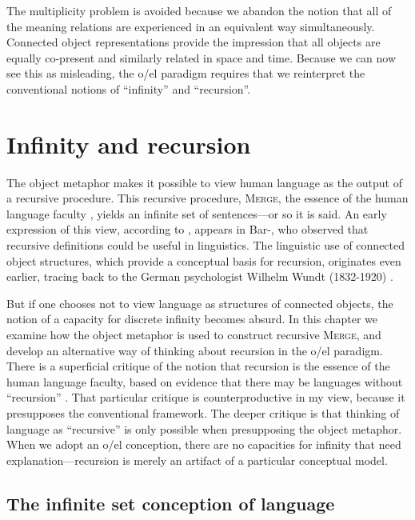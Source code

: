   The multiplicity problem is avoided because we abandon the notion that all of the meaning relations are experienced in an equivalent way simultaneously. Connected object representations provide the impression that all objects are equally co-present and similarly related in space and time. Because we can now see this as misleading, the o/el paradigm requires that we reinterpret the conventional notions of “infinity” and “recursion”.

\chapter{Infinity and recursion}

The object metaphor makes it possible to view human language as the output of a recursive procedure. This recursive procedure, \textsc{Merge}, the essence of the human language faculty \citep{Chomsky2001b,Chomsky2008}, yields an infinite set of sentences—or so it is said. An early expression of this view, according to \citet{Tomalin2007}, appears in Bar-\citet{Hillel1953}, who observed that recursive definitions could be useful in linguistics. The linguistic use of connected object structures, which provide a conceptual basis for recursion, originates even earlier, tracing back to the German psychologist Wilhelm Wundt (1832-1920) \citep{Seuren1998}.

  But if one chooses not to view language as structures of connected objects, the notion of a capacity for discrete infinity becomes absurd. In this chapter we examine how the object metaphor is used to construct recursive \textsc{Merge}, and develop an alternative way of thinking about recursion in the o/el paradigm. There is a superficial critique of the notion that recursion is the essence of the human language faculty, based on evidence that there may be languages without “recursion” \citep{Everett2005}. That particular critique is counterproductive in my view, because it presupposes the conventional framework. The deeper critique is that thinking of language as “recursive” is only possible when presupposing the object metaphor. When we adopt an o/el conception, there are no capacities for infinity that need explanation—recursion is merely an artifact of a particular conceptual model.

\section{The infinite set conception of language}

